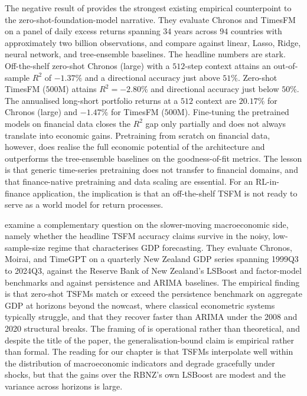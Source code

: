 The negative result of \citet{Rahimikia2025} provides the strongest existing
empirical counterpoint to the zero-shot-foundation-model narrative. They
evaluate Chronos and TimesFM on a panel of daily excess returns spanning $34$
years across $94$ countries with approximately two billion observations, and
compare against linear, Lasso, Ridge, neural network, and tree-ensemble
baselines. The headline numbers are stark. Off-the-shelf zero-shot Chronos
(large) with a $512$-step context attains an out-of-sample $R^2$ of $-1.37\%$
and a directional accuracy just above $51\%$. Zero-shot TimesFM ($500$M) attains
$R^2 = -2.80\%$ and directional accuracy just below $50\%$. The annualised
long-short portfolio returns at a $512$ context are $20.17\%$ for Chronos
(large) and $-1.47\%$ for TimesFM ($500$M). Fine-tuning the pretrained models on
financial data closes the $R^2$ gap only partially and does not always translate
into economic gains. Pretraining from scratch on financial data, however, does
realise the full economic potential of the architecture and outperforms the
tree-ensemble baselines on the goodness-of-fit metrics. The lesson is that
generic time-series pretraining does not transfer to financial domains, and
that finance-native pretraining and data scaling are essential. For an
RL-in-finance application, the implication is that an off-the-shelf TSFM is not
ready to serve as a world model for return processes.

\citet{Jetwiriyanon2025} examine a complementary question on the slower-moving
macroeconomic side, namely whether the headline TSFM accuracy claims survive in
the noisy, low-sample-size regime that characterises GDP forecasting. They
evaluate Chronos, Moirai, and TimeGPT on a quarterly New Zealand GDP series
spanning 1999Q3 to 2024Q3, against the Reserve Bank of New Zealand's LSBoost and
factor-model benchmarks and against persistence and ARIMA baselines. The
empirical finding is that zero-shot TSFMs match or exceed the persistence
benchmark on aggregate GDP at horizons beyond the nowcast, where classical
econometric systems typically struggle, and that they recover faster than ARIMA
under the 2008 and 2020 structural breaks. The framing of \citet{Jetwiriyanon2025}
is operational rather than theoretical, and despite the title of the paper, the
generalisation-bound claim is empirical rather than formal. The reading for our
chapter is that TSFMs interpolate well within the distribution of macroeconomic
indicators and degrade gracefully under shocks, but that the gains over the
RBNZ's own LSBoost are modest and the variance across horizons is large.

